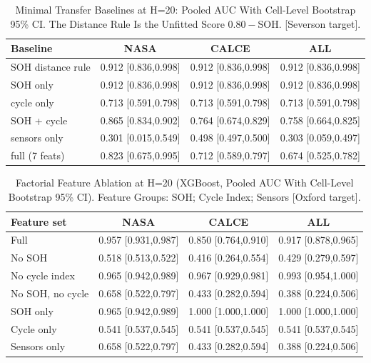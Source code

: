 \documentclass[preprint,12pt]{elsarticle}
\begin{document}
\begin{table}
\centering
\caption{Minimal Transfer Baselines at H=20: Pooled AUC With Cell-Level Bootstrap 95\% CI. The Distance Rule Is the Unfitted Score $0.80-$SOH. [Severson target].}
\label{tab:baselines-severson}
\begin{tabular}{lccc}
\toprule
\textbf{Baseline} & \textbf{NASA} & \textbf{CALCE} & \textbf{ALL} \\
\midrule
SOH distance rule & 0.912 [0.836,0.998] & 0.912 [0.836,0.998] & 0.912 [0.836,0.998] \\
SOH only & 0.912 [0.836,0.998] & 0.912 [0.836,0.998] & 0.912 [0.836,0.998] \\
cycle only & 0.713 [0.591,0.798] & 0.713 [0.591,0.798] & 0.713 [0.591,0.798] \\
SOH + cycle & 0.865 [0.834,0.902] & 0.764 [0.674,0.829] & 0.758 [0.664,0.825] \\
sensors only & 0.301 [0.015,0.549] & 0.498 [0.497,0.500] & 0.303 [0.059,0.497] \\
full (7 feats) & 0.823 [0.675,0.995] & 0.712 [0.589,0.797] & 0.674 [0.525,0.782] \\
\bottomrule
\end{tabular}
\end{table}

\begin{table}
\centering
\caption{Factorial Feature Ablation at H=20 (XGBoost, Pooled AUC With Cell-Level Bootstrap 95\% CI). Feature Groups: SOH; Cycle Index; Sensors [Oxford target].}
\label{tab:abl-oxford}
\begin{tabular}{lccc}
\toprule
\textbf{Feature set} & \textbf{NASA} & \textbf{CALCE} & \textbf{ALL} \\
\midrule
Full & 0.957 [0.931,0.987] & 0.850 [0.764,0.910] & 0.917 [0.878,0.965] \\
No SOH & 0.518 [0.513,0.522] & 0.416 [0.264,0.554] & 0.429 [0.279,0.597] \\
No cycle index & 0.965 [0.942,0.989] & 0.967 [0.929,0.981] & 0.993 [0.954,1.000] \\
No SOH, no cycle & 0.658 [0.522,0.797] & 0.433 [0.282,0.594] & 0.388 [0.224,0.506] \\
SOH only & 0.965 [0.942,0.989] & 1.000 [1.000,1.000] & 1.000 [1.000,1.000] \\
Cycle only & 0.541 [0.537,0.545] & 0.541 [0.537,0.545] & 0.541 [0.537,0.545] \\
Sensors only & 0.658 [0.522,0.797] & 0.433 [0.282,0.594] & 0.388 [0.224,0.506] \\
\bottomrule
\end{tabular}
\end{table}
\end{document}
